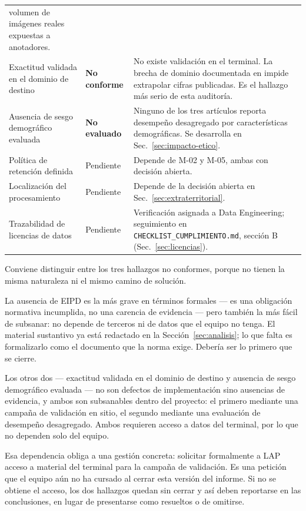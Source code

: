 {\begin{longtable}{@{}L{3.6cm}L{2.0cm}L{6.4cm}@{}}
volumen de imágenes reales expuestas a anotadores. \\
\addlinespace
Exactitud validada en el dominio de destino &
\textbf{No conforme} &
No existe validación en el terminal. La brecha de dominio documentada en
\cite{Lin_2025_CVPR} impide extrapolar cifras publicadas. Es el hallazgo
más serio de esta auditoría. \\
\addlinespace
Ausencia de sesgo demográfico evaluada &
\textbf{No evaluado} &
Ninguno de los tres artículos reporta desempeño desagregado por
características demográficas. Se desarrolla en
Sec.~\ref{sec:impacto-etico}. \\
\addlinespace
Política de retención definida &
Pendiente &
Depende de M-02 y M-05, ambas con decisión abierta. \\
\addlinespace
Localización del procesamiento &
Pendiente &
Depende de la decisión abierta en Sec.~\ref{sec:extraterritorial}. \\
\addlinespace
Trazabilidad de licencias de datos &
Pendiente &
Verificación asignada a Data Engineering; seguimiento en
\texttt{CHECKLIST\_\allowbreak CUMPLIMIENTO.md}, sección B
(Sec.~\ref{sec:licencias}). \\
\end{longtable}}

Conviene distinguir entre los tres hallazgos no conformes, porque no
tienen la misma naturaleza ni el mismo camino de solución.

La ausencia de EIPD es la más grave en términos formales --- es una
obligación normativa incumplida, no una carencia de evidencia --- pero
también la más fácil de subsanar: no depende de terceros ni de datos que
el equipo no tenga. El material sustantivo ya está redactado en la
Sección~\ref{sec:analisis}; lo que falta es formalizarlo como el
documento que la norma exige. Debería ser lo primero que se cierre.

Los otros dos --- exactitud validada en el dominio de destino y ausencia
de sesgo demográfico evaluada --- no son defectos de implementación sino
ausencias de evidencia, y ambos son subsanables dentro del proyecto: el
primero mediante una campaña de validación en sitio, el segundo mediante
una evaluación de desempeño desagregado. Ambos requieren acceso a datos
del terminal, por lo que no dependen solo del equipo.

Esa dependencia obliga a una gestión concreta: solicitar formalmente a
LAP acceso a material del terminal para la campaña de validación. Es una
petición que el equipo aún no ha cursado al cerrar esta versión del
informe. Si no se obtiene el acceso, los dos hallazgos quedan sin cerrar
y así deben reportarse en las conclusiones, en lugar de presentarse como
resueltos o de omitirse.
